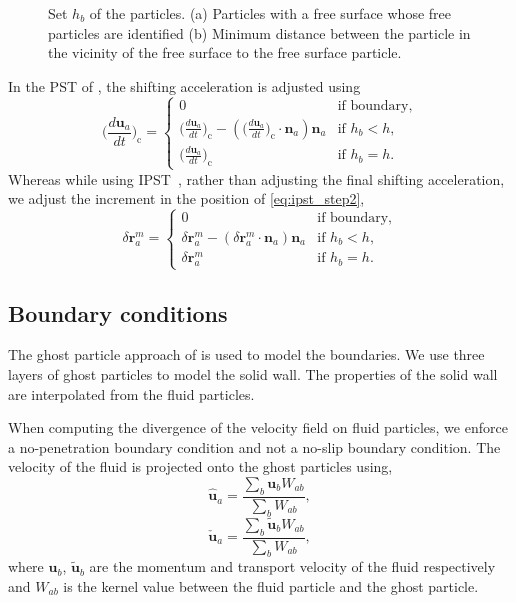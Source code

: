 \documentclass[preprint,12pt]{elsarticle}
\newcommand{\ten}[1]{\ensuremath{\mathbf{#1}}}
\begin{document}
\begin{figure}[!htpb]
\begin{subfigure}{0.1\textwidth}
    \subcaption{}%
    \label{fig:pst_free_surf_zoomed}
  \end{subfigure}
  \caption{
    Set $h_b$ of the particles. (a) Particles with a free surface whose
    free particles are identified (b) Minimum distance between the particle in
    the vicinity of the free surface to the free surface particle.}
\label{fig:pst_free_surf}
\end{figure}
%


In the PST of \citet{sun_consistent_2019}, the shifting acceleration is
adjusted using
\begin{equation}
 \label{eq:shifting_force_free_surface_adjust_sun2019}
 \bigg(\frac{d \ten{u}_a}{dt}\bigg)_{\text{c}} =\begin{cases}
   0& \text{if boundary},\\
   \big(\frac{d \ten{u}_a}{dt}\big)_{\text{c}}  - (\big(\frac{d \ten{u}_a}{dt}\big)_{\text{c}} \cdot \ten{n}_a) \ten{n}_a& \text{if $h_b < h$},\\
   \big(\frac{d \ten{u}_a}{dt}\big)_{\text{c}}& \text{if $h_b = h$}.
 \end{cases}
\end{equation}
Whereas while using IPST~\cite{huang_kernel_2019}, rather than adjusting the
final shifting acceleration, we adjust the increment in the position of
\cref{eq:ipst_step2},
\begin{equation}
 \label{eq:shifting_force_free_surface_adjust_ipst}
 \delta \ten{r}_a^{m} =\begin{cases}
   0& \text{if boundary},\\
   \delta \ten{r}_a^{m} - (\delta \ten{r}_a^{m}  \cdot \ten{n}_a) \ten{n}_a& \text{if $h_b < h$},\\
   \delta \ten{r}_a^{m}& \text{if $h_b = h$}.
 \end{cases}
\end{equation}

\subsection{Boundary conditions}

The ghost particle approach of \citet{Adami2012} is used to model the
boundaries. We use three layers of ghost particles to model the solid wall.
The properties of the solid wall are interpolated from the fluid particles.

When computing the divergence of the velocity field on fluid particles, we
enforce a no-penetration boundary condition and not a no-slip boundary
condition. The velocity of the fluid is projected onto the ghost particles
using,
\begin{equation}
  \label{eq:v-ghost}
  \ten{\hat{u}}_a = \frac{\sum_b\ten{u}_b W_{ab}}{\sum_b W_{ab}},
\end{equation}
\begin{equation}
  \label{eq:v-hat-ghost}
  \ten{\check{u}}_a = \frac{\sum_b\tilde{\ten{u}}_b W_{ab}}{\sum_b W_{ab}},
\end{equation}
where $\ten{u}_b$, $\ten{\tilde{u}}_b$ are the momentum and transport velocity
of the fluid respectively and $W_{ab}$ is the kernel value between the fluid
particle and the ghost particle.
\end{document}
